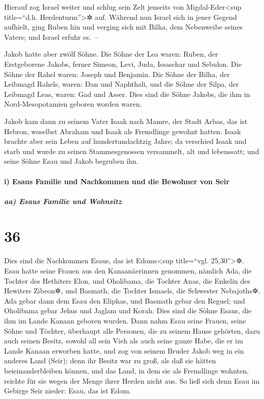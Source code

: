  Hierauf zog Israel weiter und schlug sein Zelt jenseits
von Migdal-Eder\textless sup title=``d.h. Herdenturm''\textgreater✲ auf.
 Während nun Israel sich in jener Gegend aufhielt, ging
Ruben hin und verging sich mit Bilha, dem Nebenweibe seines Vaters; und
Israel erfuhr es.~--

Jakob hatte aber zwölf Söhne.  Die Söhne der Lea waren:
Ruben, der Erstgeborene Jakobs, ferner Simeon, Levi, Juda, Issaschar und
Sebulon.  Die Söhne der Rahel waren: Joseph und Benjamin.
 Die Söhne der Bilha, der Leibmagd Rahels, waren: Dan und
Naphthali,  und die Söhne der Silpa, der Leibmagd Leas,
waren: Gad und Asser. Dies sind die Söhne Jakobs, die ihm in
Nord-Mesopotamien geboren worden waren.

 Jakob kam dann zu seinem Vater Isaak nach Mamre, der
Stadt Arbas, das ist Hebron, woselbst Abraham und Isaak als Fremdlinge
gewohnt hatten.  Isaak brachte aber sein Leben auf
hundertundachtzig Jahre;  da verschied Isaak und starb
und wurde zu seinen Stammesgenossen versammelt, alt und lebenssatt; und
seine Söhne Esau und Jakob begruben ihn.

\hypertarget{i-esaus-familie-und-nachkommen-und-die-bewohner-von-seir}{%
\paragraph{i) Esaus Familie und Nachkommen und die Bewohner von
Seir}\label{i-esaus-familie-und-nachkommen-und-die-bewohner-von-seir}}

\hypertarget{aa-esaus-familie-und-wohnsitz}{%
\subparagraph{aa) Esaus Familie und
Wohnsitz}\label{aa-esaus-familie-und-wohnsitz}}

\hypertarget{section-35}{%
\section{36}\label{section-35}}

 Dies sind die Nachkommen Esaus, das ist
Edoms\textless sup title=``vgl. 25,30''\textgreater✲. 
Esau hatte seine Frauen aus den Kanaanäerinnen genommen, nämlich Ada,
die Tochter des Hethiters Elon, und Oholibama, die Tochter Anas, die
Enkelin des Hewiters Zibeon✲,  und Basmath, die Tochter
Ismaels, die Schwester Nebajoths✲.  Ada gebar dann dem
Esau den Eliphas, und Basmath gebar den Reguel;  und
Oholibama gebar Jehus und Jaglam und Korah. Dies sind die Söhne Esaus,
die ihm im Lande Kanaan geboren wurden.  Dann nahm Esau
seine Frauen, seine Söhne und Töchter, überhaupt alle Personen, die zu
seinem Hause gehörten, dazu auch seinen Besitz, sowohl all sein Vieh als
auch seine ganze Habe, die er im Lande Kanaan erworben hatte, und zog
von seinem Bruder Jakob weg in ein anderes Land (Seir); 
denn ihr Besitz war zu groß, als daß sie hätten beieinanderbleiben
können, und das Land, in dem sie als Fremdlinge wohnten, reichte für sie
wegen der Menge ihrer Herden nicht aus.  So ließ sich denn
Esau im Gebirge Seir nieder: Esau, das ist Edom.

